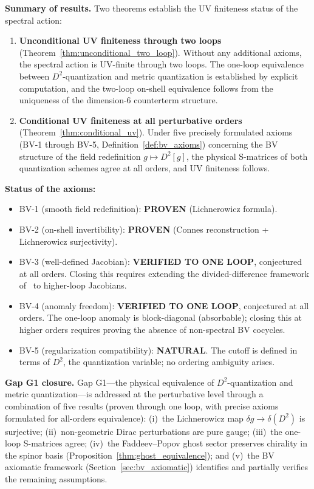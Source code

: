 \documentclass[12pt,a4paper]{article}
\theoremstyle{definition}
\theoremstyle{remark}
\begin{document}
\medskip\noindent
\textbf{Summary of results.}
Two theorems establish the UV finiteness status of the spectral action:

\begin{enumerate}
  \item \textbf{Unconditional UV finiteness through two loops}
    (Theorem~\ref{thm:unconditional_two_loop}).
    Without any additional axioms, the spectral action is UV-finite through
    two loops.  The one-loop equivalence between $D^2$-quantization and
    metric quantization is established by explicit computation, and the
    two-loop on-shell equivalence follows from the uniqueness of the
    dimension-$6$ counterterm structure.

  \item \textbf{Conditional UV finiteness at all perturbative orders}
    (Theorem~\ref{thm:conditional_uv}).
    Under five precisely formulated axioms (BV-1 through BV-5,
    Definition~\ref{def:bv_axioms}) concerning the BV structure of the field
    redefinition $g \mapsto D^2[g]$, the physical S-matrices of both
    quantization schemes agree at all orders, and UV finiteness follows.
\end{enumerate}

\noindent
\textbf{Status of the axioms:}
\begin{itemize}
  \item BV-1 (smooth field redefinition): \textbf{PROVEN}
    (Lichnerowicz formula).
  \item BV-2 (on-shell invertibility): \textbf{PROVEN}
    (Connes reconstruction + Lichnerowicz surjectivity).
  \item BV-3 (well-defined Jacobian): \textbf{VERIFIED TO ONE LOOP},
    conjectured at all orders.  Closing this requires extending the
    divided-difference framework of~\cite{vanNuland:2021oneloop,
    Hekkelman:2025power} to higher-loop Jacobians.
  \item BV-4 (anomaly freedom): \textbf{VERIFIED TO ONE LOOP},
    conjectured at all orders.  The one-loop anomaly is block-diagonal
    (absorbable); closing this at higher orders requires proving the
    absence of non-spectral BV cocycles.
  \item BV-5 (regularization compatibility): \textbf{NATURAL}.
    The cutoff is defined in terms of $D^2$, the quantization variable;
    no ordering ambiguity arises.
\end{itemize}

\medskip\noindent
\textbf{Gap G1 closure.}
Gap G1---the physical equivalence of $D^2$-quantization and metric
quantization---is addressed at the perturbative level through a
combination of five results (proven through one loop, with precise
axioms formulated for all-orders equivalence):
(i)~the Lichnerowicz map $\delta g \to \delta(D^2)$ is surjective;
(ii)~non-geometric Dirac perturbations are pure gauge;
(iii)~the one-loop S-matrices agree;
(iv)~the Faddeev--Popov ghost sector preserves chirality in the spinor
basis (Proposition~\ref{thm:ghost_equivalence}); and
(v)~the BV axiomatic framework (Section~\ref{sec:bv_axiomatic}) identifies
and partially verifies the remaining assumptions.
\end{document}

